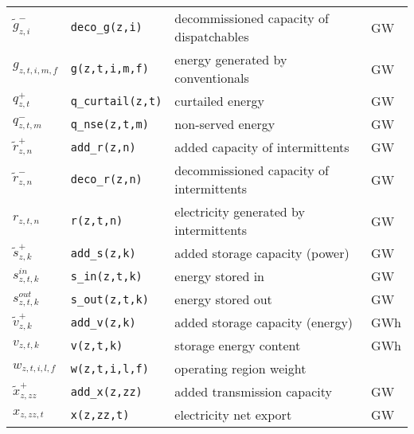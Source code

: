 \documentclass[final, 3p, times]{elsarticle} %
\begin{document}
\begin{table*}
\begin{tabulary}{\textwidth}{LLLL}
            $\widetilde{g}^{-}_{z,i}$     & \texttt{deco\_g(z,i)}         & decommissioned capacity of dispatchables & GW        \\
            $g_{z,t,i,m,f}$               & \texttt{g(z,t,i,m,f)}         & energy generated by conventionals & GW        \\
            $q^{+}_{z,t}$                 & \texttt{q\_curtail(z,t)}      & curtailed energy & GW        \\
            $q^{-}_{z,t,m}$               & \texttt{q\_nse(z,t,m)}        & non-served energy & GW        \\
            $\widetilde{r}^{+}_{z,n}$     & \texttt{add\_r(z,n)}          & added capacity of intermittents & GW        \\
            $\widetilde{r}^{-}_{z,n}$     & \texttt{deco\_r(z,n)}         & decommissioned capacity of intermittents & GW        \\
            $r_{z,t,n}$                   & \texttt{r(z,t,n)}             & electricity generated by intermittents & GW        \\
            $\widetilde{s}^{+}_{z,k}$     & \texttt{add\_s(z,k)}          & added storage capacity (power)              & GW        \\
            $s^{in}_{z,t,k}$              & \texttt{s\_in(z,t,k)}         & energy stored in & GW        \\
            $s^{out}_{z,t,k}$             & \texttt{s\_out(z,t,k)}        & energy stored out & GW        \\
            $\widetilde{v}^{+}_{z,k}$     & \texttt{add\_v(z,k)}          & added storage capacity (energy)             & GWh       \\
            $v_{z,t,k}$                   & \texttt{v(z,t,k)}             & storage energy content & GWh       \\
            $w_{z,t,i,l,f}$               & \texttt{w(z,t,i,l,f)}         & operating region weight &           \\
            $\widetilde{x}^{+}_{z,zz}$    & \texttt{add\_x(z,zz)}         & added transmission capacity & GW        \\
            $x_{z,zz,t}$                  & \texttt{x(z,zz,t)}            & electricity net export & GW        \\
            \bottomrule
        \end{tabulary}
    \end{table*}

    \newpage
\end{document}
